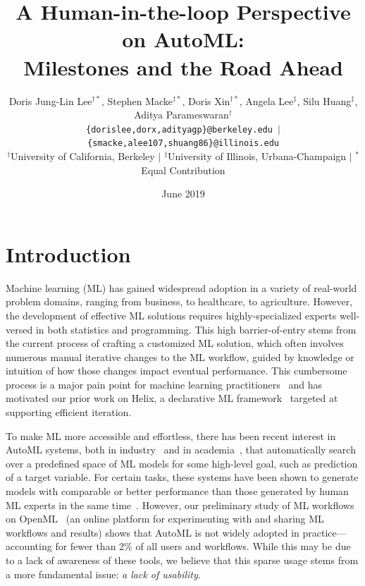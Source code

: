 \documentclass[11pt,dvipdfmx]{article}
\title{A Human-in-the-loop Perspective on AutoML:\\ Milestones and the Road Ahead}
\author{{\small Doris Jung-Lin Lee$^{\dagger*}$, Stephen Macke$^{\ddagger*}$, Doris Xin$^{\dagger*}$, Angela Lee$^{\ddagger}$, Silu Huang$^{\ddagger}$, Aditya Parameswaran$^{\dagger}$}\\
{\small \texttt{\{dorislee,dorx,adityagp\}@berkeley.edu $|$ 
\{smacke,alee107,shuang86\}@illinois.edu}}\\
{\small $^{\dagger}$University of California, Berkeley $|$  $^{\ddagger}$University of Illinois, Urbana-Champaign} $|$
{\small $^*$Equal Contribution}}
\date{June 2019}
\begin{document}
\maketitle
\vspace{-30pt}
\section{Introduction}
\par Machine learning (ML) has gained widespread adoption in a variety of real-world problem domains, ranging from business, to healthcare, to agriculture. However, the development of effective ML solutions requires highly-specialized experts well-versed in both statistics and programming. This high barrier-of-entry stems from the current process of crafting a customized ML solution, which often involves numerous manual iterative changes to the ML workflow, guided by knowledge or intuition of how those changes impact eventual performance. This cumbersome process is a major pain point for machine learning practitioners~\cite{Amershi2019,yang2018grounding} and has motivated our prior work on Helix, a declarative ML framework~\cite{xin2018helix} targeted at supporting efficient iteration. 
\par To make ML more accessible and effortless, there has been recent interest in AutoML systems, both in industry~\cite{H2O,azureAutoML,googleAutoML} and in academia~\cite{Feurer2015,olson_tpot_2018}, that automatically search over a predefined space of ML models for some high-level goal, such as prediction of a target variable. For certain tasks, these systems have been shown to generate models with comparable or better performance than those generated by human ML experts in the same time~\cite{kaggledays2019,automl}.
However, our preliminary study of ML workflows on OpenML~\cite{OpenML2013} (an online platform for experimenting with and sharing ML workflows and results) shows that AutoML is not widely adopted in practice---accounting for fewer than 2\% of all users and workflows. While this may be due to a lack of awareness  of these tools, we believe that this sparse usage stems from a more fundamental issue: {\em a lack of usability}. 
\end{document}
